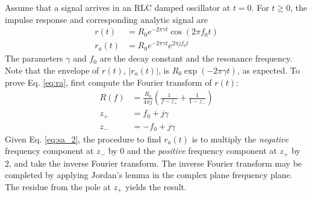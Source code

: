 \documentclass[amsmath,amssymb,aps,prd,10pt,twocolumn,showkeys]{revtex4}
\begin{document}
Assume that a signal arrives in an RLC damped oscillator at $t=0$.  For $t\geq 0$, the impulse response and corresponding analytic signal are
\begin{align}
r(t) &= R_0 e^{-2 \pi \gamma t} \cos(2\pi f_0 t) \label{eq:r} \\
r_a(t) &= R_0 e^{-2 \pi \gamma t} e^{2\pi j f_0 t} \label{eq:ra}
\end{align}
The parameters $\gamma$ and $f_0$ are the decay constant and the resonance frequency.  Note that the envelope of $r(t)$, $|r_a(t)|$, is $R_0 \exp(-2 \pi \gamma t)$, as expected.  To prove Eq. \ref{eq:ra}, first compute the Fourier transform of $r(t)$:
\begin{align}
R(f) &= \frac{R_0}{4\pi j} \left( \frac{1}{f - z_{+}} + \frac{1}{1- z_{-}} \right) \\
z_{+} &= f_0 + j \gamma \\
z_{-} &= -f_0 + j \gamma
\end{align}
Given Eq. \ref{eq:sa_2}, the procedure to find $r_a(t)$ is to multiply the \textit{negative} frequency component at $z_{-}$ by 0 and the \textit{positive} frequency component at $z_{+}$ by 2, and take the inverse Fourier transform.  The inverse Fourier transform may be completed by applying Jordan's lemma in the complex plane frequency plane.  The residue from the pole at $z_{+}$ yields the result.
\end{document}

